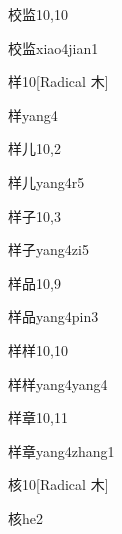 \begin{entry}{校监}{10,10}
  \begin{phonetics}{校监}{xiao4jian1}
  \end{phonetics}
\end{entry}

\begin{entry}{样}{10}[Radical 木]
  \begin{phonetics}{样}{yang4}
  \end{phonetics}
\end{entry}

\begin{entry}{样儿}{10,2}
  \begin{phonetics}{样儿}{yang4r5}
  \end{phonetics}
\end{entry}

\begin{entry}{样子}{10,3}
  \begin{phonetics}{样子}{yang4zi5}
  \end{phonetics}
\end{entry}

\begin{entry}{样品}{10,9}
  \begin{phonetics}{样品}{yang4pin3}
  \end{phonetics}
\end{entry}

\begin{entry}{样样}{10,10}
  \begin{phonetics}{样样}{yang4yang4}
  \end{phonetics}
\end{entry}

\begin{entry}{样章}{10,11}
  \begin{phonetics}{样章}{yang4zhang1}
  \end{phonetics}
\end{entry}

\begin{entry}{核}{10}[Radical 木]
  \begin{phonetics}{核}{he2}
  \end{phonetics}
\end{entry}

